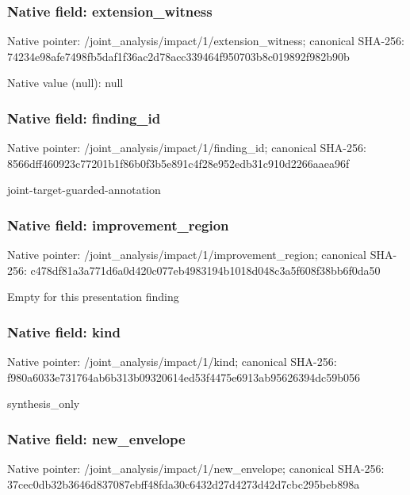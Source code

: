 \documentclass[10pt,a4paper]{article}
\begin{document}
\subsubsection{Native field: extension\_\allowbreak{}witness}
Native pointer: /joint\_\allowbreak{}analysis/impact/1/extension\_\allowbreak{}witness; canonical SHA-256: 74234e98afe7498fb5daf1f36ac2d78acc339464f950703b8c019892f982b90b

Native value (null): null

\subsubsection{Native field: finding\_\allowbreak{}id}
Native pointer: /joint\_\allowbreak{}analysis/impact/1/finding\_\allowbreak{}id; canonical SHA-256: 8566dff460923c77201b1f86b0f3b5e891c4f28e952edb31c910d2266aaea96f

\begingroup\raggedright\sloppy joint-target-guarded-annotation\par\endgroup

\subsubsection{Native field: improvement\_\allowbreak{}region}
Native pointer: /joint\_\allowbreak{}analysis/impact/1/improvement\_\allowbreak{}region; canonical SHA-256: c478df81a3a771d6a0d420c077eb4983194b1018d048c3a5f608f38bb6f0da50

\begingroup\raggedright\sloppy Empty for this presentation finding\par\endgroup

\subsubsection{Native field: kind}
Native pointer: /joint\_\allowbreak{}analysis/impact/1/kind; canonical SHA-256: f980a6033e731764ab6b313b09320614ed53f4475e6913ab95626394dc59b056

\begingroup\raggedright\sloppy synthesis\_\allowbreak{}only\par\endgroup

\subsubsection{Native field: new\_\allowbreak{}envelope}
Native pointer: /joint\_\allowbreak{}analysis/impact/1/new\_\allowbreak{}envelope; canonical SHA-256: 37cec0db32b3646d837087ebff48fda30c6432d27d4273d42d7cbc295beb898a
\end{document}

